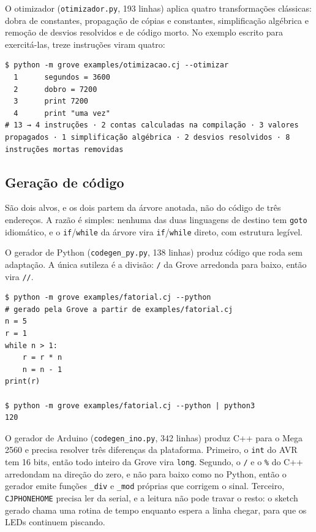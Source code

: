\documentclass[conference]{IEEEtran}
\begin{document}
O otimizador (\texttt{otimizador.py}, 193 linhas) aplica quatro transformações clássicas: dobra de constantes, propagação de cópias e constantes, simplificação algébrica e remoção de desvios resolvidos e de código morto. No exemplo escrito para exercitá-las, treze instruções viram quatro:

\begin{lstlisting}
$ python -m grove examples/otimizacao.cj --otimizar
  1      segundos = 3600
  2      dobro = 7200
  3      print 7200
  4      print "uma vez"
# 13 → 4 instruções · 2 contas calculadas na compilação · 3 valores propagados · 1 simplificação algébrica · 2 desvios resolvidos · 8 instruções mortas removidas
\end{lstlisting}

\subsection{Geração de código}

São dois alvos, e os dois partem da árvore anotada, não do código de três endereços. A razão é simples: nenhuma das duas linguagens de destino tem \texttt{goto} idiomático, e o \texttt{if}/\texttt{while} da árvore vira \texttt{if}/\texttt{while} direto, com estrutura legível.

O gerador de Python (\texttt{codegen\_py.py}, 138 linhas) produz código que roda sem adaptação. A única sutileza é a divisão: \texttt{/} da Grove arredonda para baixo, então vira \texttt{//}.

\begin{lstlisting}
$ python -m grove examples/fatorial.cj --python
# gerado pela Grove a partir de examples/fatorial.cj
n = 5
r = 1
while n > 1:
    r = r * n
    n = n - 1
print(r)

$ python -m grove examples/fatorial.cj --python | python3
120
\end{lstlisting}

O gerador de Arduino (\texttt{codegen\_ino.py}, 342 linhas) produz C++ para o Mega 2560 e precisa resolver três diferenças da plataforma. Primeiro, o \texttt{int} do AVR tem 16 bits, então todo inteiro da Grove vira \texttt{long}. Segundo, o \texttt{/} e o \texttt{\%} do C++ arredondam na direção do zero, e não para baixo como no Python, então o gerador emite funções \texttt{\_div} e \texttt{\_mod} próprias que corrigem o sinal. Terceiro, \texttt{CJPHONEHOME} precisa ler da serial, e a leitura não pode travar o resto: o sketch gerado chama uma rotina de tempo enquanto espera a linha chegar, para que os LEDs continuem piscando.
\end{document}
